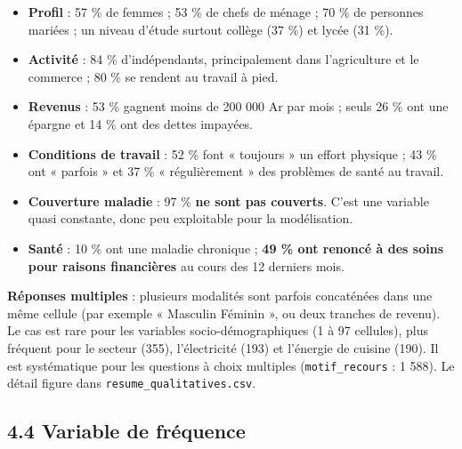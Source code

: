 \documentclass[

  french,

  10pt,

  a4paper,

]{article}
\providecommand{\tightlist}{%

  \setlength{\itemsep}{0pt}\setlength{\parskip}{0pt}}
\begin{document}
\begin{itemize}

\tightlist

\item

  \textbf{Profil} : 57 \% de femmes ; 53 \% de chefs de ménage ; 70 \% de personnes mariées ; un niveau d'étude surtout collège (37 \%) et lycée (31 \%).

\item

  \textbf{Activité} : 84 \% d'indépendants, principalement dans l'agriculture et le commerce ; 80 \% se rendent au travail à pied.

\item

  \textbf{Revenus} : 53 \% gagnent moins de 200 000 Ar par mois ; seuls 26 \% ont une épargne et 14 \% ont des dettes impayées.

\item

  \textbf{Conditions de travail} : 52 \% font « toujours » un effort physique ; 43 \% ont « parfois » et 37 \% « régulièrement » des problèmes de santé au travail.

\item

  \textbf{Couverture maladie} : 97 \% \textbf{ne sont pas couverts}. C'est une variable quasi constante, donc peu exploitable pour la modélisation.

\item

  \textbf{Santé} : 10 \% ont une maladie chronique ; \textbf{49 \% ont renoncé à des soins pour raisons financières} au cours des 12 derniers mois.

\end{itemize}



\textbf{Réponses multiples} : plusieurs modalités sont parfois concaténées dans une même cellule (par exemple « Masculin Féminin », ou deux tranches de revenu). Le cas est rare pour les variables socio-démographiques (1 à 97 cellules), plus fréquent pour le secteur (355), l'électricité (193) et l'énergie de cuisine (190). Il est systématique pour les questions à choix multiples (\texttt{motif\_recours} : 1 588). Le détail figure dans \texttt{resume\_qualitatives.csv}.



\subsection{4.4 Variable de fréquence}
\end{document}
